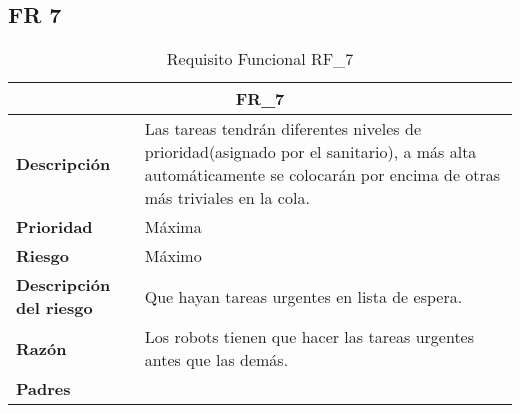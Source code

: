 \documentclass{scrreprt}
\begin{document}
\subsection{FR 7}
    \begin{table}[H]
    
    \label{tab:my-table}
    
    \begin{tabular}{|p{5cm}|p{11cm}|}
    \hline
    \multicolumn{2}{|c|}{\textbf{FR_7}} \\
    \hline
    \textbf{Descripción  }                      & Las tareas tendrán diferentes niveles de prioridad(asignado por el sanitario), a más alta automáticamente se colocarán por encima de otras más triviales en la cola.                                                                            \\ \hline
    \textbf{Prioridad}                          & Máxima                                                                                              \\ \hline
    \textbf{Riesgo}                          & Máximo                                                                                                \\ \hline
    \textbf{Descripción del riesgo}                    & Que hayan tareas urgentes en lista de espera.                                                                          \\ \hline
    \textbf{Razón}                   & Los robots tienen que hacer las tareas urgentes antes que las demás.                                                                                        \\ \hline
    \textbf{Padres}                               &  \\  \hline
    \end{tabular}%
    
    \caption{Requisito Funcional RF_7}
\end{table}
\end{document}
